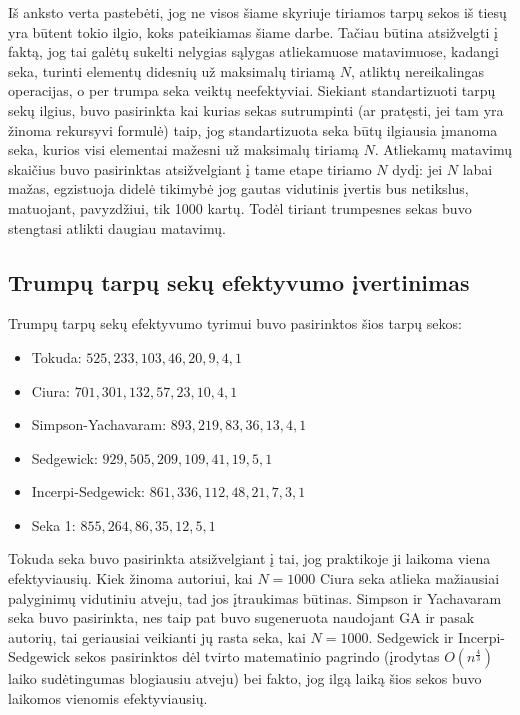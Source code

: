 \documentclass{VUMIFInfKursinis}
\begin{document}
Iš anksto verta pastebėti, jog ne visos šiame skyriuje tiriamos tarpų sekos iš tiesų yra būtent tokio ilgio, koks pateikiamas šiame darbe.
Tačiau būtina atsižvelgti į faktą, jog tai galėtų sukelti nelygias sąlygas atliekamuose matavimuose,
kadangi seka, turinti elementų didesnių už maksimalų tiriamą $N$, atliktų nereikalingas operacijas, o per trumpa seka veiktų neefektyviai.
Siekiant standartizuoti tarpų sekų ilgius, buvo pasirinkta kai kurias sekas sutrumpinti (ar pratęsti, jei tam yra žinoma rekursyvi formulė)
taip, jog standartizuota seka būtų ilgiausia įmanoma seka, kurios visi elementai mažesni už maksimalų tiriamą $N$.
Atliekamų matavimų skaičius buvo pasirinktas atsižvelgiant į tame etape tiriamo $N$ dydį: jei $N$ labai mažas,
egzistuoja didelė tikimybė jog gautas vidutinis įvertis bus netikslus, matuojant, pavyzdžiui, tik 1000 kartų.
Todėl tiriant trumpesnes sekas buvo stengtasi atlikti daugiau matavimų.

\subsection{Trumpų tarpų sekų efektyvumo įvertinimas}
Trumpų tarpų sekų efektyvumo tyrimui buvo pasirinktos šios tarpų sekos:
\begin{itemize}
  \item Tokuda: $525,233,103,46,20,9,4,1$
  \item Ciura: $701,301,132,57,23,10,4,1$
  \item Simpson-Yachavaram: $893,219,83,36,13,4,1$
  \item Sedgewick: $929,505,209,109,41,19,5,1$
  \item Incerpi-Sedgewick: $861,336,112,48,21,7,3,1$
  \item Seka 1: $855,264,86,35,12,5,1$
\end{itemize}
Tokuda \cite{10.5555/645569.659879} seka buvo pasirinkta atsižvelgiant į tai, jog praktikoje ji laikoma viena efektyviausių.
Kiek žinoma autoriui, kai $N=1000$ Ciura \cite{ciura2001best} seka atlieka mažiausiai palyginimų vidutiniu atveju, tad jos įtraukimas būtinas.
Simpson ir Yachavaram \cite{simpson1999faster} seka buvo pasirinkta, nes taip pat buvo sugeneruota naudojant GA ir pasak autorių,
tai geriausiai veikianti jų rasta seka, kai $N=1000$.
Sedgewick \cite{SEDGEWICK1986159} ir Incerpi-Sedgewick \cite{incerpi1985improved} sekos pasirinktos dėl tvirto matematinio pagrindo
(įrodytas $O(n^\frac{4}{3})$ laiko sudėtingumas blogiausiu atveju) bei fakto, jog ilgą laiką šios sekos buvo laikomos vienomis efektyviausių.
\end{document}
